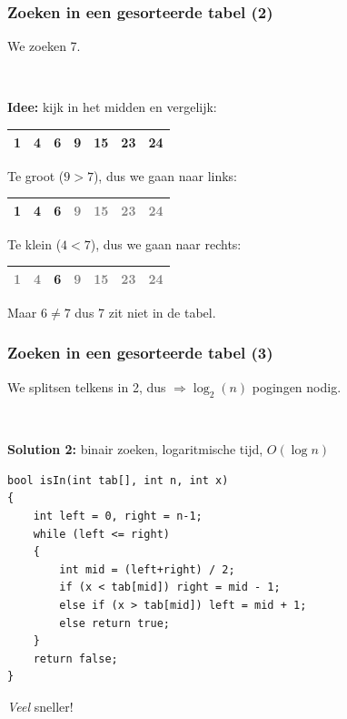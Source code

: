\documentclass[12pt]{beamer}
\newcommand{\gray}{\textcolor{gray}}
\begin{document}
\begin{frame}
\frametitle{Zoeken in een gesorteerde tabel (2)}
We zoeken 7.

~

\textbf{Idee:} kijk in het midden en vergelijk:
\begin{center}
\def\arraystretch{1.3}
\begin{tabu} to .7\textwidth {|X[c]|X[c]|X[c]|X[c]|X[c]|X[c]|X[c]|}
 & 4 & 6 & \textbf{9} & 15 & 23 & 24 \\
\hline
\end{tabu}
\end{center}
Te groot ($9>7$), dus we gaan naar links:
\begin{center}
\def\arraystretch{1.3}
\begin{tabu} to .7\textwidth {|X[c]|X[c]|X[c]|X[c]|X[c]|X[c]|X[c]|}
 & \textbf{4} & 6 & \gray{9} & \gray{15} & \gray{23} & \gray{24} \\
\hline
\end{tabu}
\end{center}
Te klein ($4<7$), dus we gaan naar rechts:
\begin{center}
\def\arraystretch{1.3}
\begin{tabu} to .7\textwidth {|X[c]|X[c]|X[c]|X[c]|X[c]|X[c]|X[c]|}
\hline
\gray{1} & \gray{4} & \textbf{6} & \gray{9} & \gray{15} & \gray{23} & \gray{24} \\
\hline
\end{tabu}
\end{center}
Maar $6\neq7$ dus 7 zit niet in de tabel.
\end{frame}

\begin{frame}[fragile]
\frametitle{Zoeken in een gesorteerde tabel (3)}
We splitsen telkens in 2, dus $\Rightarrow \log_2(n)$ pogingen nodig.

~

\textbf{Solution 2:} binair zoeken, logaritmische tijd, $O(\log n)$
\begin{lstlisting}
bool isIn(int tab[], int n, int x)
{
    int left = 0, right = n-1;
    while (left <= right)
    {
        int mid = (left+right) / 2;
        if (x < tab[mid]) right = mid - 1;
        else if (x > tab[mid]) left = mid + 1;
        else return true;
    }
    return false;
}
\end{lstlisting}
\emph{Veel} sneller!
\end{frame}
\end{document}
